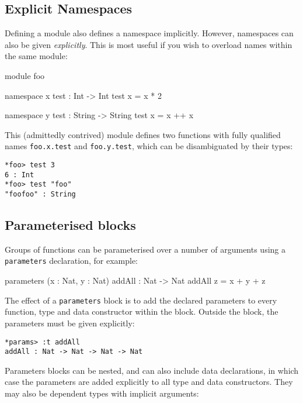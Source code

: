 \subsection{Explicit Namespaces}

Defining a module also defines a namespace implicitly.
However, namespaces can also be given \emph{explicitly}.
This is most useful if you wish to overload names within the same module:

\begin{code}
module foo

namespace x
  test : Int -> Int
  test x = x * 2

namespace y
  test : String -> String
  test x = x ++ x 
\end{code}

\noindent
This (admittedly contrived) module defines two functions with fully qualified names
\texttt{foo.x.test} and \texttt{foo.y.test}, which can be disambiguated by their types:

\begin{lstlisting}[style=stdout]
*foo> test 3 
6 : Int
*foo> test "foo" 
"foofoo" : String
\end{lstlisting}

\subsection{Parameterised blocks}

Groups of functions can be parameterised over a number of arguments using a \texttt{parameters} declaration, for example:

\begin{code}
parameters (x : Nat, y : Nat)
    addAll : Nat -> Nat
    addAll z = x + y + z
\end{code}

\noindent
The effect of a \texttt{parameters} block is to add the declared parameters to every function, type and data constructor within the block.
Outside the block, the parameters must be given explicitly:

\begin{lstlisting}[style=stdout]
*params> :t addAll
addAll : Nat -> Nat -> Nat -> Nat
\end{lstlisting}

\noindent
Parameters blocks can be nested, and can also include data declarations, in which case the parameters are added explicitly to all type and data constructors.
They may also be dependent types with implicit arguments:

